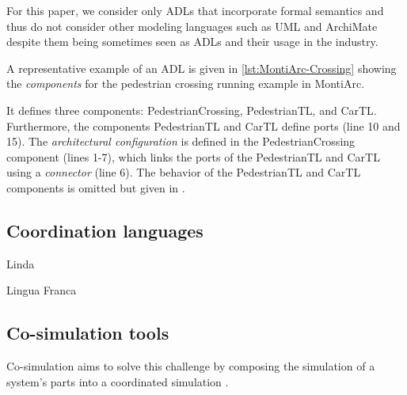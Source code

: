 \documentclass[runningheads]{llncs}
\begin{document}
For this paper, we consider only ADLs that incorporate formal semantics and thus do not consider other modeling languages such as UML \cite{objectmanagementgroupUnifiedModelingLanguage2017} and ArchiMate \cite{theopengroupArchiMateSpecification2023} despite them being sometimes seen as ADLs and their usage in the industry.

A representative example of an ADL is given in  \autoref{lst:MontiArc-Crossing} showing the \textit{components} for the pedestrian crossing running example in MontiArc.



It defines three components: \textsf{PedestrianCrossing}, \textsf{PedestrianTL}, and \textsf{CarTL}.
Furthermore, the components \textsf{PedestrianTL} and \textsf{CarTL} define ports (line 10 and 15).
The \textit{architectural configuration} is defined in the \textsf{PedestrianCrossing} component (lines 1-7), which links the ports of the \textsf{PedestrianTL} and \textsf{CarTL} using a \textit{connector} (line 6).
The behavior of the \textsf{PedestrianTL} and \textsf{CarTL} components is omitted but given in \cite{timkrauterArtifactsCoordination2024}.

\subsection{Coordination languages}

Linda \cite{carrieroLindaContext1989}
\cite{papadopoulosCoordinationModelsLanguages1998}

Lingua Franca \cite{lohstrohLinguaFrancaDeterministic2021}

\subsection{Co-simulation tools}
\cite{gomesCoSimulationSurvey2019} %

Co-simulation aims to solve this challenge by composing the simulation of a system's parts into a coordinated simulation \cite{gomesCoSimulationSurvey2019}.
\end{document}
